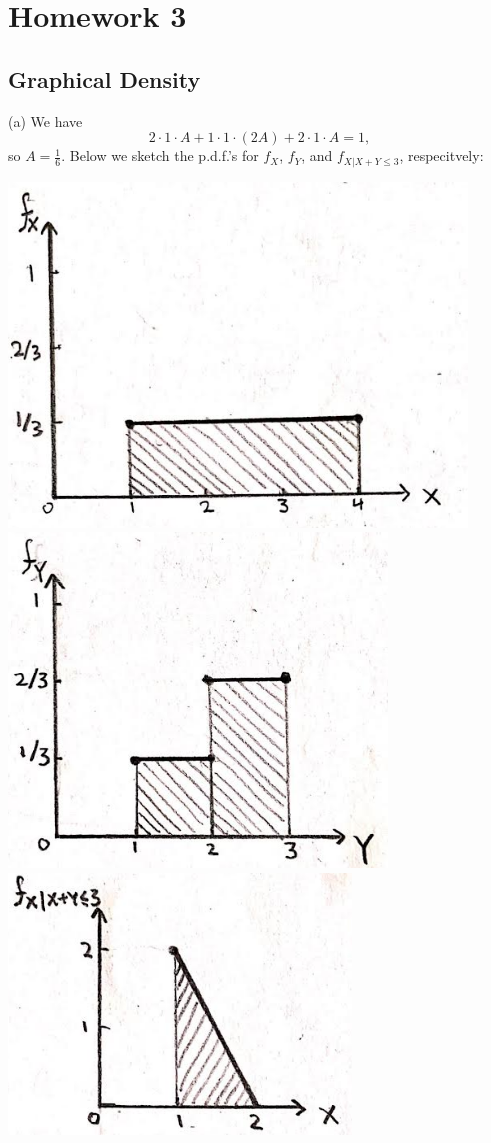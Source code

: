 \section{Homework 3}

\subsection{Graphical Density}
(a) We have
\[
2\cdot1\cdot A + 1\cdot1\cdot (2A) + 2\cdot1\cdot A = 1,
\]
so $A = \frac{1}{6}$. Below we sketch the p.d.f.'s for $f_X$, $f_Y$, and $f_{X|X+Y\leq3}$, respecitvely:

\includegraphics[scale=0.3]{f_X}
\includegraphics[scale=0.3]{f_Y}
\includegraphics[scale=0.4]{f_conditional}

